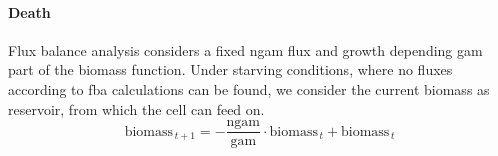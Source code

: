 \paragraph{Death}
Flux balance analysis considers a fixed ngam flux and growth depending gam part of the biomass function.
Under starving conditions, where no fluxes according to fba calculations can be found, we consider the current biomass as reservoir, from which the cell can feed on.
\[
  \textrm{biomass}_{\,t+1} = -\frac{\textrm{ngam}}{\textrm{gam}}\cdot \textrm{biomass}_{\,t}+\textrm{biomass}_{\,t}
\]
